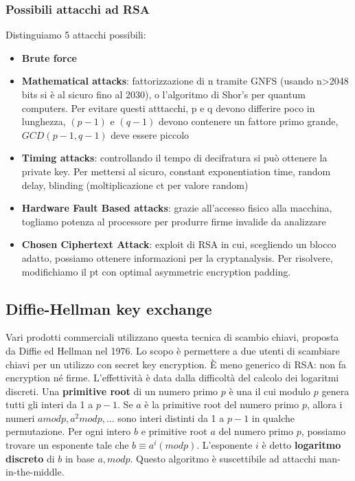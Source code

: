\documentclass[11pt]{article}
\begin{document}
\subsubsection{Possibili attacchi ad RSA}
Distinguiamo 5 attacchi possibili:
\begin{itemize}
    \item \textbf{Brute force}
    \item \textbf{Mathematical attacks}: fattorizzazione di n tramite GNFS (usando n>2048 bits si è al sicuro fino al 2030), o l'algoritmo di Shor's per quantum computers. Per evitare questi atttacchi, p e q devono differire poco in lunghezza, $(p-1)$ e $(q-1)$ devono contenere un fattore primo grande, $GCD(p-1,q-1)$ deve essere piccolo
    \item \textbf{Timing attacks}: controllando il tempo di decifratura si può ottenere la private key. Per mettersi al sicuro, constant exponentiation time, random delay, blinding (moltiplicazione ct per valore random)
    \item \textbf{Hardware Fault Based attacks}: grazie all'accesso fisico alla macchina, togliamo potenza al processore per produrre firme invalide da analizzare
    \item \textbf{Chosen Ciphertext Attack}: exploit di RSA in cui, scegliendo un blocco adatto, possiamo ottenere informazioni per la cryptanalysis. Per risolvere, modifichiamo il pt con optimal asymmetric encryption padding.
\end{itemize}

\subsection{Diffie-Hellman key exchange}
Vari prodotti commerciali utilizzano questa tecnica di scambio chiavi, proposta da Diffie ed Hellman nel 1976. Lo scopo è permettere a due utenti di scambiare chiavi per un utilizzo con secret key encryption. È meno generico di RSA: non fa encryption né firme. L'effettività è data dalla difficoltà del calcolo dei logaritmi discreti.
Una \textbf{primitive root} di un numero primo $p$ è una il cui modulo $p$ genera tutti gli interi da 1 a $p-1$.
Se $a$ è la primitive root del numero primo $p$, allora i numeri $a mod p, a^2 mod p,...$ sono interi distinti da 1 a $p-1$ in qualche permutazione. Per ogni intero $b$ e primitive root $a$ del numero primo $p$, possiamo trovare un esponente tale che $b \equiv a^i (mod p)$. L'esponente $i$ è detto \textbf{logaritmo discreto} di $b$ in base $a, mod p$.
Questo algoritmo è suscettibile ad attacchi man-in-the-middle.
\end{document}
